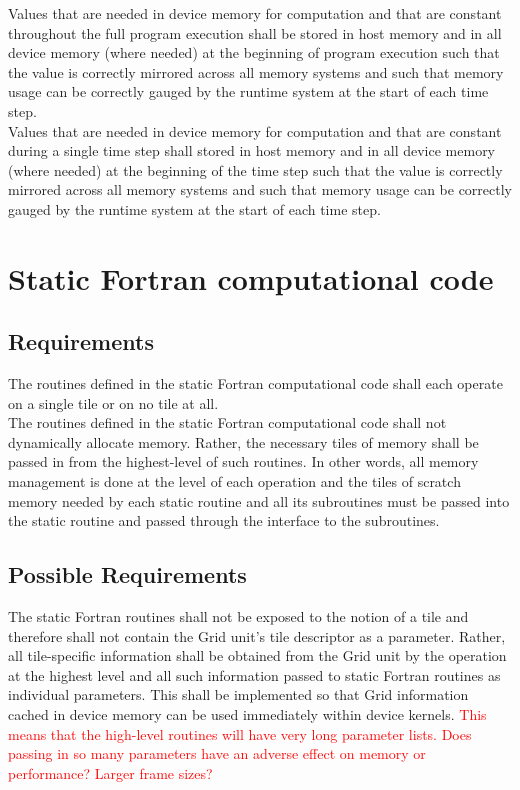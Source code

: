 \documentclass{article}
\begin{document}
Values that are needed in device memory for computation and that are constant
throughout the full program execution shall be stored in host memory and in all
device memory (where needed) at the beginning of program execution such that the
value is correctly mirrored across all memory systems and such that memory
usage can be correctly gauged by the runtime system at the start of each time
step.\\

Values that are needed in device memory for computation and that are constant
during a single time step shall stored in host memory and in all device memory
(where needed) at the beginning of the time step such that the value is
correctly mirrored across all memory systems and such that memory usage can be
correctly gauged by the runtime system at the start of each time step.

\section{Static Fortran computational code}
\subsection{Requirements}
The routines defined in the static Fortran computational code shall each operate
on a single tile or on no tile at all.\\

The routines defined in the static Fortran computational code shall not
dynamically allocate memory.  Rather, the necessary tiles of memory shall be
passed in from the highest-level of such routines.  In other words, all memory
management is done at the level of each operation and the tiles of scratch
memory needed by each static routine and all its subroutines must be passed into
the static routine and passed through the interface to the subroutines.

\subsection{Possible Requirements}
The static Fortran routines shall not be exposed to the notion of a tile and
therefore shall not contain the Grid unit's tile descriptor as a parameter.
Rather, all tile-specific information shall be obtained from the Grid unit by
the operation at the highest level and all such information passed to static
Fortran routines as individual parameters.  This shall be implemented so that
Grid information cached in device memory can be used immediately within device
kernels.  \textcolor{red}{This means that the high-level routines will have very
long parameter lists.  Does passing in so many parameters have an adverse effect
on memory or performance?  Larger frame sizes?}
\end{document}
